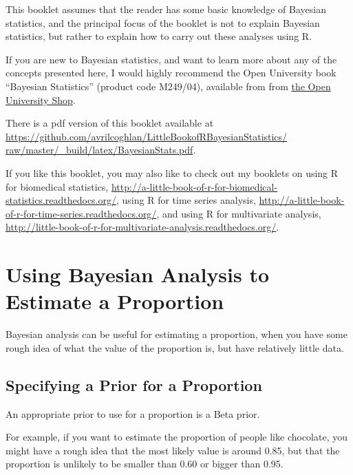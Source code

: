 \documentclass[a4paper,10pt,english]{sphinxmanual}
\begin{document}
This booklet assumes that the reader has some basic knowledge of Bayesian statistics, and
the principal focus of the booklet is not to explain Bayesian statistics, but rather
to explain how to carry out these analyses using R.

If you are new to Bayesian statistics, and want to learn more about any of the concepts
presented here, I would highly recommend the Open University book
``Bayesian Statistics'' (product code M249/04), available from
from \href{http://www.ouw.co.uk/store/}{the Open University Shop}.

There is a pdf version of this booklet available at
\href{https://github.com/avrilcoghlan/LittleBookofRBayesianStatistics/raw/master/\_build/latex/BayesianStats.pdf}{https://github.com/avrilcoghlan/LittleBookofRBayesianStatistics/ raw/master/\_build/latex/BayesianStats.pdf}.

If you like this booklet, you may also like to check out my booklets on using
R for biomedical statistics,
\href{http://a-little-book-of-r-for-biomedical-statistics.readthedocs.org/}{http://a-little-book-of-r-for-biomedical-statistics.readthedocs.org/},
using R for time series analysis,
\href{http://a-little-book-of-r-for-time-series.readthedocs.org/}{http://a-little-book-of-r-for-time-series.readthedocs.org/},
and using R for multivariate analysis,
\href{http://little-book-of-r-for-multivariate-analysis.readthedocs.org/}{http://little-book-of-r-for-multivariate-analysis.readthedocs.org/}.


\section{Using Bayesian Analysis to Estimate a Proportion}
\label{src/bayesianstats:using-bayesian-analysis-to-estimate-a-proportion}
Bayesian analysis can be useful for estimating a proportion, when you have some rough
idea of what the value of the proportion is, but have relatively little data.


\subsection{Specifying a Prior for a Proportion}
\label{src/bayesianstats:specifying-a-prior-for-a-proportion}
An appropriate prior to use for a proportion is a Beta prior.

For example, if you want to estimate the proportion of people like chocolate, you
might have a rough idea that the most likely value is around 0.85, but that the proportion
is unlikely to be smaller than 0.60 or bigger than 0.95.
\end{document}
